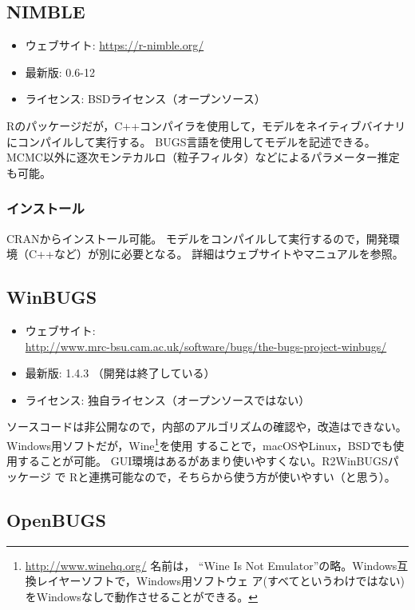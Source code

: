 \documentclass[11pt,uplatex]{jsarticle}
\begin{document}
\subsection{NIMBLE}
\label{NIMBLE}
\begin{itemize}
\item ウェブサイト: \url{https://r-nimble.org/}
\item 最新版: 0.6-12
\item ライセンス: BSDライセンス（オープンソース）
\end{itemize}

\textsf{R}のパッケージだが，C++コンパイラを使用して，モデルをネイティブバイナリにコンパイルして実行する。
\textsf{BUGS}言語を使用してモデルを記述できる。
MCMC以外に逐次モンテカルロ（粒子フィルタ）などによるパラメーター推定も可能。

\subsubsection*{インストール}
CRANからインストール可能。
モデルをコンパイルして実行するので，開発環境（C++など）が別に必要となる。
詳細はウェブサイトやマニュアルを参照。

\subsection{WinBUGS}

\begin{itemize}
\item ウェブサイト:\\
  \url{http://www.mrc-bsu.cam.ac.uk/software/bugs/the-bugs-project-winbugs/}
\item 最新版: 1.4.3 （開発は終了している）
\item ライセンス: 独自ライセンス（オープンソースではない）
\end{itemize}

ソースコードは非公開なので，内部のアルゴリズムの確認や，改造はできない。
Windows用ソフトだが，\textsf{Wine}\footnote{\url{http://www.winehq.org/} 名前は，
``Wine Is Not Emulator''の略。Windows互換レイヤーソフトで，Windows用ソフトウェ
ア(すべてというわけではない)をWindowsなしで動作させることができる。}を使用
することで，macOSやLinux，BSDでも使用することが可能。
GUI環境はあるがあまり使いやすくない。\textsf{R2WinBUGS}パッケージ
で \textsf{R}と連携可能なので，そちらから使う方が使いやすい（と思う）。

\subsection{OpenBUGS}
\end{document}

